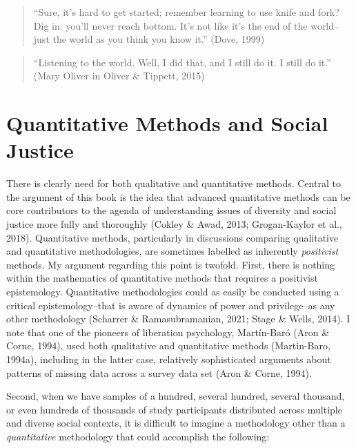 \documentclass[
  letterpaper,
  DIV=11,
  numbers=noendperiod]{scrreprt}
\begin{document}
\begin{quote}
``Sure, it's hard to get started; remember learning to use knife and
fork? Dig in: you'll never reach bottom. It's not like it's the end of
the world--just the world as you think you know it.'' (Dove, 1999)
\end{quote}

\begin{quote}
``Listening to the world. Well, I did that, and I still do it. I still
do it.'' (Mary Oliver in Oliver \& Tippett, 2015) 
\end{quote}

\section{Quantitative Methods and Social
Justice}\label{sec-socialjustice}

There is clearly need for both qualitative and quantitative methods.
 Central to the argument of
this book is the idea that advanced quantitative methods can be core
contributors to the agenda of understanding issues of diversity and
social justice more fully and thoroughly (Cokley \& Awad, 2013;
Grogan-Kaylor et al., 2018). Quantitative methods, particularly in
discussions comparing qualitative and quantitative methodologies, are
sometimes labelled as inherently \emph{positivist} methods.
 My argument regarding this point is twofold. First,
there is nothing within the mathematics of quantitative methods that
requires a positivist epistemology. Quantitative methodologies could as
easily be conducted using a critical epistemology--that is aware of
dynamics of power and privilege--as any other methodology (Scharrer \&
Ramasubramanian, 2021; Stage \& Wells, 2014).
  I note
that one of the pioneers of liberation psychology, Martín-Baró (Aron \&
Corne, 1994), used both qualitative and quantitative methods
(Martin-Baro, 1994a), including in the latter case, relatively
sophisticated arguments about patterns of missing data across a survey
data set (Aron \& Corne, 1994). 

Second, when we have samples of a hundred, several hundred, several
thousand, or even hundreds of thousands of study participants
distributed across multiple and diverse social contexts, it is difficult
to imagine a methodology other than a \emph{quantitative} methodology
that could accomplish the following:
\end{document}
